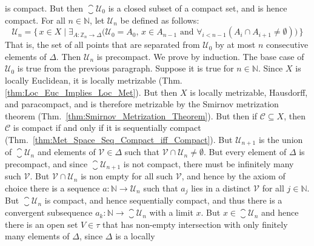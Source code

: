 \documentclass{article}                                                        %
\begin{document}
\begin{solution}
            is compact. But then $\closure{\mathcal{U}_{0}}$ is a closed subset
            of a compact set, and is hence compact. For all $n\in\mathbb{N}$,
            let $\mathcal{U}_{n}$ be defined as follows:
            \begin{equation}
                \mathcal{U}_{n}=\Big\{\,x\in{X}\;|\;
                    \exists_{A:\mathbb{Z}_{n}\rightarrow\Delta}\big(
                        \mathcal{U}_{0}=A_{0},\,x\in{A}_{n-1}\textrm{ and }
                        \forall_{i<n-1}(A_{i}\cap{A}_{i+1}\ne\emptyset)
                    \big)\,\Big\}
            \end{equation}
            That is, the set of all points that are separated from
            $\mathcal{U}_{0}$ by at most $n$ consecutive elements of $\Delta$.
            Then $\mathcal{U}_{n}$ is precompact. We prove by induction. The
            base case of $\mathcal{U}_{0}$ is true from the previous paragraph.
            Suppose it is true for $n\in\mathbb{N}$. Since $X$ is locally
            Euclidean, it is locally metrizable
            (Thm.\ref{thm:Loc_Euc_Implies_Loc_Met}). But then $X$ is locally
            metrizable, Hausdorff, and paracompact, and is therefore metrizable
            by the Smirnov metrization theorem
            (Thm.~\ref{thm:Smirnov_Metrization_Theorem}). But then if
            $\mathcal{C}\subseteq{X}$, then $\mathcal{C}$ is compact if and only
            if it is sequentially compact
            (Thm.~\ref{thm:Met_Space_Seq_Compact_iff_Compact}). But
            $\mathcal{U}_{n+1}$ is the union of $\closure{\mathcal{U}_{n}}$ and
            elements of $\mathcal{V}\in\Delta$ such that
            $\mathcal{V}\cap\mathcal{U}_{n}\ne\emptyset$. But every element of
            $\Delta$ is precompact, and since $\closure{\mathcal{U}_{n+1}}$ is
            not compact, there must be infinitely many such $\mathcal{V}$. But
            $\mathcal{V}\cap\mathcal{U}_{n}$ is non
            empty for all such $\mathcal{V}$, and hence by the axiom of choice
            there is a sequence $a:\mathbb{N}\rightarrow\mathcal{U}_{n}$ such
            that $a_{j}$ lies in a distinct $\mathcal{V}$ for all
            $j\in\mathbb{N}$. But $\closure{\mathcal{U}_{n}}$ is compact, and
            hence sequentially compact, and thus there is a convergent
            subsequence $a_{k}:\mathbb{N}\rightarrow\closure{\mathcal{U}_{n}}$
            with a limit $x$. But $x\in\closure{\mathcal{U}_{n}}$ and hence
            there is an open set $V\in\tau$ that has non-empty intersection with
            only finitely many elements of $\Delta$, since $\Delta$ is a locally

\end{solution}
\end{document}
